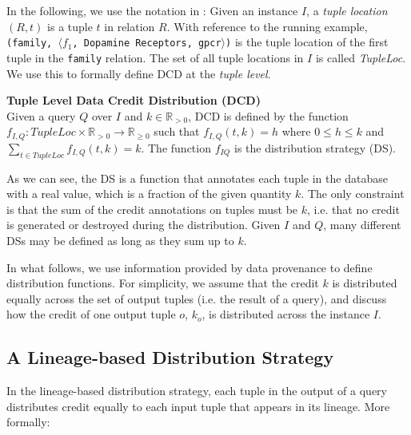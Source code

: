 In the following, we use the notation in \citet{CheneyProvSurvey}: Given an instance $I$, a \emph{tuple location} $(R, t)$ is a tuple $t$ in  relation $R$. With reference to the running example, \texttt{(family, $\langle f_1$, Dopamine Receptors, gpcr$\rangle$)} is the tuple location of the first tuple in the \texttt{family} relation.  The set of all tuple locations in $I$ is called \emph{TupleLoc}.  We use this to formally define DCD at the \emph{tuple level}.


\begin{definition}
    \textbf{Tuple Level Data Credit Distribution (DCD)}~\citep{dosso2020data}
    \label{def:CDT}\\
    Given a query $Q$ over $I$ and $k \in \mathbb{R}_{>0}$, {DCD} is defined by the 
    function $f_{I, Q} : TupleLoc \times \mathbb{R}_{> 0} \rightarrow \mathbb{R}_{\geq0}$ such that $f_{I,Q}(t, k)=h$ where $0 \leq h \leq k$ and $\sum_{t \in TupleLoc}f_{I, Q}(t, k) = k$.  The function $f_{I Q}$ is the distribution strategy (DS).
\end{definition}

As we can see, the DS is a function that annotates each tuple in the database with a real value, which is a fraction of the given quantity $k$. The only constraint is that the sum of the credit annotations on tuples must be $k$, i.e. that no credit is generated or destroyed during the distribution.
Given $I$ and $Q$, many different DSs may be defined as long as they sum up to $k$. 

In what follows, we use information provided by data provenance to define distribution functions.
For simplicity, we assume that the credit $k$ is distributed equally across the set of output tuples (i.e. the result of a query), and discuss how the credit of one output tuple $o$, $k_o$, is distributed across the instance $I$.

\subsection{A Lineage-based Distribution Strategy}
In the lineage-based distribution strategy, each tuple in the output of a query distributes credit equally to each input tuple that appears in its lineage.  More formally:

